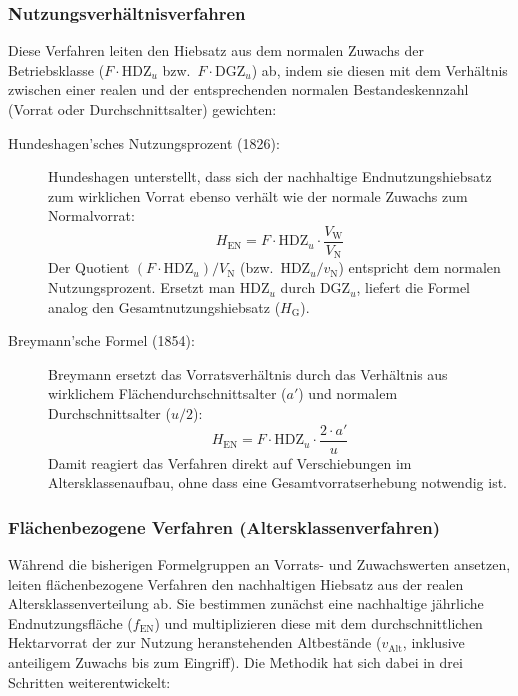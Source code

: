 \documentclass[twocolumn, paper=a4, fontsize=10pt]{scrartcl}
\begin{document}
\subsubsection{Nutzungsverhältnisverfahren}

Diese Verfahren leiten den Hiebsatz aus dem normalen Zuwachs der Betriebsklasse ($F \cdot \text{HDZ}_u$ bzw.\ $F \cdot \text{DGZ}_u$) ab, indem sie diesen mit dem Verhältnis zwischen einer realen und der entsprechenden normalen Bestandeskennzahl (Vorrat oder Durchschnittsalter) gewichten:

\begin{description}
\item[Hundeshagen'sches Nutzungsprozent (1826):] Hundeshagen unterstellt, dass sich der nachhaltige Endnutzungshiebsatz zum wirklichen Vorrat ebenso verhält wie der normale Zuwachs zum Normalvorrat:
\begin{equation}
H_{\text{EN}} = F \cdot \text{HDZ}_u \cdot \frac{V_{\text{W}}}{V_{\text{N}}}
\end{equation}
Der Quotient $(F \cdot \text{HDZ}_u) / V_{\text{N}}$ (bzw.\ $\text{HDZ}_u / v_{\text{N}}$) entspricht dem normalen Nutzungsprozent. Ersetzt man $\text{HDZ}_u$ durch $\text{DGZ}_u$, liefert die Formel analog den Gesamtnutzungshiebsatz ($H_{\text{G}}$).

\item[Breymann'sche Formel (1854):] Breymann ersetzt das Vorratsverhältnis durch das Verhältnis aus wirklichem Flächendurchschnittsalter ($a'$) und normalem Durchschnittsalter ($u/2$):
\begin{equation}
H_{\text{EN}} = F \cdot \text{HDZ}_u \cdot \frac{2 \cdot a'}{u}
\end{equation}
Damit reagiert das Verfahren direkt auf Verschiebungen im Altersklassenaufbau, ohne dass eine Gesamtvorratserhebung notwendig ist.
\end{description}

\subsubsection{Flächenbezogene Verfahren (Altersklassenverfahren)}

Während die bisherigen Formelgruppen an Vorrats- und Zuwachswerten ansetzen, leiten flächenbezogene Verfahren den nachhaltigen Hiebsatz aus der realen Altersklassenverteilung ab. Sie bestimmen zunächst eine nachhaltige jährliche Endnutzungsfläche ($f_{\text{EN}}$) und multiplizieren diese mit dem durchschnittlichen Hektarvorrat der zur Nutzung heranstehenden Altbestände ($v_{\text{Alt}}$, inklusive anteiligem Zuwachs bis zum Eingriff). Die Methodik hat sich dabei in drei Schritten weiterentwickelt:
\end{document}
